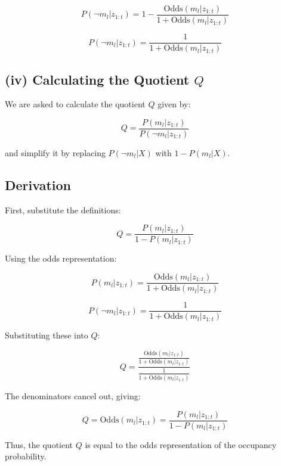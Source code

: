 \documentclass[template,12pt,a4paper,enabledeprecatedfontcommands]{template}
\begin{document}
\[
P(\neg m_l | z_{1:t}) = 1 - \frac{\text{Odds}(m_l | z_{1:t})}{1 + \text{Odds}(m_l | z_{1:t})}
\]

\[
P(\neg m_l | z_{1:t}) = \frac{1}{1 + \text{Odds}(m_l | z_{1:t})}
\]

\subsection*{(iv) Calculating the Quotient \( Q \)}
We are asked to calculate the quotient \( Q \) given by:

\[
Q = \frac{P(m_l | z_{1:t})}{P(\neg m_l | z_{1:t})}
\]

and simplify it by replacing \( P(\neg m_l | X) \) with \( 1 - P(m_l | X) \).

\subsection*{Derivation}

First, substitute the definitions:

\[
Q = \frac{P(m_l | z_{1:t})}{1 - P(m_l | z_{1:t})}
\]

Using the odds representation:

\[
P(m_l | z_{1:t}) = \frac{\text{Odds}(m_l | z_{1:t})}{1 + \text{Odds}(m_l | z_{1:t})}
\]

\[
P(\neg m_l | z_{1:t}) = \frac{1}{1 + \text{Odds}(m_l | z_{1:t})}
\]

Substituting these into \( Q \):

\[
Q = \frac{\frac{\text{Odds}(m_l | z_{1:t})}{1 + \text{Odds}(m_l | z_{1:t})}}{\frac{1}{1 + \text{Odds}(m_l | z_{1:t})}}
\]

The denominators cancel out, giving:

\[
Q = \text{Odds}(m_l | z_{1:t}) = \frac{P(m_l | z_{1:t})}{1 - P(m_l | z_{1:t})}
\]

Thus, the quotient \( Q \) is equal to the odds representation of the occupancy probability.
\end{document}
